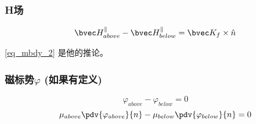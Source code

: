\subsubsection{H场}
\begin{equation}
\bvec H^\parallel_{above} - \bvec H^\parallel_{below} = \bvec K_f \times \hat n 
\end{equation}

\autoref{eq_mbdy_2}  是他的推论。


\subsubsection{磁标势$\varphi$ (如果有定义)}
\begin{equation}
\varphi_{above}-\varphi_{below}=0
\end{equation}
\begin{equation}
\mu_{above}\pdv{\varphi_{above}}{n} - \mu_{below}\pdv{\varphi_{below}}{n}  = 0
\end{equation}
